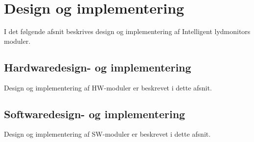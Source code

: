 \newpage
\section{Design og implementering}
I det følgende afsnit beskrives design og implementering af Intelligent lydmonitors moduler.

\subsection{Hardwaredesign- og implementering}
Design og implementering af HW-moduler er beskrevet i dette afsnit.






\newpage
\subsection{Softwaredesign- og implementering}
Design og implementering af SW-moduler er beskrevet i dette afsnit.








